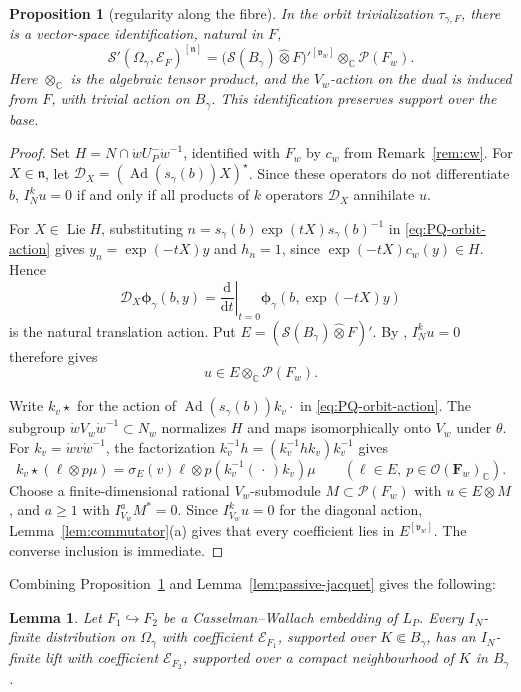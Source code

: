 \documentclass[a4paper,12pt]{amsart}
\numberwithin{equation}{section}
\newtheorem{proposition}[theorem]{Proposition}
\newtheorem{lemma}[theorem]{Lemma}
\theoremstyle{definition}
\theoremstyle{remark}
\newcommand{\F}{\mathbf F}
\newcommand{\C}{\mathbb C}
\newcommand{\fn}{\mathfrak n}
\newcommand{\IN}{I_N}
\newcommand{\mcS}{\mathcal S}
\newcommand{\mcE}{\mathcal E}
\newcommand{\mcP}{\mathcal P}
\newcommand{\Ad}{\operatorname{Ad}}
\newcommand{\Lie}{\operatorname{Lie}}
\begin{document}
\begin{proposition}[regularity along the fibre]\label{prop:PQ-poly-densities}
In the orbit trivialization $\tau_{\gamma,F}$, there is a vector-space identification, natural in $F$,
\begin{equation}\label{eq:PQ-polynomial-coefficients}
 \mcS'(\Omega_\gamma,\mcE_F)^{[\fn]} = \bigl(\mcS(B_\gamma)\widehat\otimes F\bigr)'^{[\mathfrak v_w]}
 \otimes_\C\mcP(F_w).
\end{equation}
Here $\otimes_\C$ is the algebraic tensor product, and the $V_w$-action on the dual is induced from $F$, with trivial action on $B_\gamma$. This identification preserves support over the base.
\end{proposition}
\begin{proof}
Set $H=N\cap\dot wU_P^-\dot w^{-1}$, identified with $F_w$ by $c_w$ from Remark~\ref{rem:cw}. For $X\in\fn$, let $\mathscr D_X=(\Ad(s_\gamma(b))X)^\star$. Since these operators do not differentiate $b$, $\IN^ku=0$ if and only if all products of $k$ operators $\mathscr D_X$ annihilate $u$.

For $X\in\Lie H$, substituting $n=s_\gamma(b)\exp(tX)s_\gamma(b)^{-1}$ in \eqref{eq:PQ-orbit-action} gives $y_n=\exp(-tX)y$ and $h_n=1$, since $\exp(-tX)c_w(y)\in H$. Hence
\[
 \mathscr D_X\boldsymbol\phi_\gamma(b,y)
 =\left.\frac{\mathrm d}{\mathrm dt}\right|_{t=0}
   \boldsymbol\phi_\gamma(b,\exp(-tX)y)
\]
is the natural translation action. Put $E=(\mcS(B_\gamma)\widehat\otimes F)'$. By \cite[Proposition~A.4]{Abe12}, $\IN^ku=0$ therefore gives
\[
 u\in E\otimes_\C\mcP(F_w).
\]

Write $k_v\star$ for the action of $\Ad(s_\gamma(b))k_v\cdot$ in \eqref{eq:PQ-orbit-action}. The subgroup $\dot wV_w\dot w^{-1}\subset N_w$ normalizes $H$ and maps isomorphically onto $V_w$ under $\theta$. For $k_v=\dot wv\dot w^{-1}$, the factorization $k_v^{-1}h=(k_v^{-1}hk_v)k_v^{-1}$ gives
\[
 k_v\star(\ell\otimes p\mu)
 =\sigma_E(v)\ell\otimes p(k_v^{-1}(\,\cdot\,)k_v)\mu
 \qquad(\ell\in E,\ p\in\mathcal O(\F_w)_\C).
\]
Choose a finite-dimensional rational $V_w$-submodule $M\subset\mcP(F_w)$ with $u\in E\otimes M$, and $a\ge1$ with $I_{V_w}^aM^*=0$. Since $I_{V_w}^ku=0$ for the diagonal action, Lemma~\ref{lem:commutator}(a) gives that every coefficient lies in $E^{[\mathfrak v_w]}$. The converse inclusion is immediate.
\end{proof}

Combining Proposition~\ref{prop:PQ-poly-densities} and Lemma~\ref{lem:passive-jacquet} gives the following:
\begin{lemma}\label{lem:PQ-local-lifting}
Let $F_1\hookrightarrow F_2$ be a Casselman--Wallach embedding of $L_P$. Every $\IN$-finite distribution on $\Omega_\gamma$ with coefficient $\mcE_{F_1}$, supported over $K\Subset B_\gamma$, has an $\IN$-finite lift with coefficient $\mcE_{F_2}$, supported over a compact neighbourhood of $K$ in $B_\gamma$.
\end{lemma}
\end{document}
